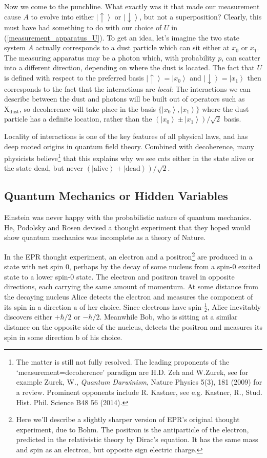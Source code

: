 \documentclass{article}
\theoremstyle{plain}\theoremheaderfont{\normalfont\itshape}\theorembodyfont{\rmfamily}\theoremseparator{.}\newtheorem*{rem}{Remark}\newtheorem*{ex}{Example}\newtheorem*{proof}{Proof}\newtheorem*{altp}{Alternative proof}
\theoremstyle{plain}\theoremheaderfont{\normalfont\bfseries}\theorembodyfont{\rmfamily}\theoremseparator{.}\newtheorem{thm}{Theorem}[section]\newtheorem{lem}[thm]{Lemma}\newtheorem{prop}[thm]{Proposition}\newtheorem*{cor}{Corollary}\newtheorem{defn}[thm]{Definition}\newtheorem{clm}[thm]{Claim}\newtheorem{clminproof}{Claim}
\theoremstyle{break}\theoremheaderfont{\normalfont\itshape}\theorembodyfont{\rmfamily}\theoremseparator{.\medskip}\newtheorem*{proofskip}{Proof}\newtheorem*{exs}{Examples}\newtheorem*{rems}{Remarks}
\theoremstyle{break}\theoremheaderfont{\normalfont\bfseries}\theorembodyfont{\rmfamily}\theoremseparator{.\medskip}\newtheorem{lemskip}[thm]{Lemma}\newtheorem{defnskip}[thm]{Definition}\newtheorem{propskip}[thm]{Proposition}\newtheorem{thmskip}[thm]{Theorem}
\numberwithin{equation}{section}
\newcommand{\ket}[1]{\left| #1 \right\rangle}
\newcommand{\vb}[1]{\bm{\mathrm{#1}}}
\begin{document}
    Now we come to the punchline. What exactly was it that made our measurement cause \(A\) to evolve into either \(\ket{\uparrow}\) or \(\ket{\downarrow}\), but not a superposition? Clearly, this must have had something to do with our choice of \(U\) in (\ref{measurement_apparatus_U}). To get an idea, let's imagine the two state system \(A\) actually corresponds to a dust particle which can sit either at \(x_0\) or \(x_1\). The measuring apparatus may be a photon which, with probability \(p\), can scatter into a different direction, depending on where the dust is located. The fact that \(U\) is defined with respect to the preferred basis \(\ket{\uparrow}=\ket{x_0}\) and \(\ket{\downarrow}=\ket{x_1}\) then corresponds to the fact that the interactions are \textit{local}: The interactions we can describe between the dust and photons will be built out of operators such as \(\vb{X}_{\text{dust}}\), so decoherence will take place in the basis \(\{\ket{x_0},\ket{x_1}\}\) where the dust particle has a definite location, rather than the \((\ket{x_0}\pm\ket{x_1})/\sqrt{2}\) basis.

    Locality of interactions is one of the key features of all physical laws, and has deep rooted origins in quantum field theory. Combined with decoherence, many physicists believe\footnote{The matter is still not fully resolved. The leading proponents of the `measurement=decoherence' paradigm are H.D. Zeh and W.Zurek, see for example Zurek, W., \textit{Quantum Darwinism}, Nature Physics 5(3), 181 (2009) for a review. Prominent opponents include R. Kastner, see e.g. Kastner, R., Stud. Hist. Phil. Science B48 56 (2014).} that this explains why we see cats either in the state alive or the state dead, but never \((\ket{\text{alive}}+\ket{\text{dead}})/\sqrt{2}\).

    \subsection{Quantum Mechanics or Hidden Variables}
    Einstein was never happy with the probabilistic nature of quantum mechanics. He, Podolsky and Rosen devised a thought experiment that they hoped would show quantum mechanics was incomplete as a theory of Nature.

    In the EPR thought experiment, an electron and a positron\footnote{Here we'll describe a slightly sharper version of EPR's original thought experiment, due to Bohm. The positron is the antiparticle of the electron, predicted in the relativistic theory by Dirac's equation. It has the same mass and spin as an electron, but opposite sign electric charge.} are produced in a state with net spin 0, perhaps by the decay of some nucleus from a spin-0 excited state to a lower spin-0 state. The electron and positron travel in opposite directions, each carrying the same amount of momentum. At some distance from the decaying nucleus Alice detects the electron and measures the component of its spin in a direction \(\vb{a}\) of her choice. Since electrons have spin-\(\frac{1}{2}\), Alice inevitably discovers either \(+\hbar/2\) or \(-\hbar/2\). Meanwhile Bob, who is sitting at a similar distance on the opposite side of the nucleus, detects the positron and measures its spin in some direction \(\vb{b}\) of his choice.
    
\end{document}
